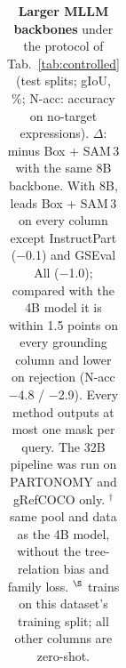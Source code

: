 \begin{table}[t]
{\begin{tabular}{l ccccccc ccccc cc}
\bottomrule
\end{tabular}}
\caption{\textbf{Larger MLLM backbones} under the protocol of Tab.~\ref{tab:controlled} (test splits; gIoU, \%; N-acc:
accuracy on no-target expressions). $\Delta$: \ours{} minus Box + SAM\,3 with the same 8B backbone. With 8B, \ours{}
leads Box + SAM\,3 on every column except InstructPart ($-$0.1) and GSEval All ($-$1.0); compared with the 4B model it is within 1.5 points on every grounding column and
lower on rejection (N-acc $-$4.8 / $-$2.9). Every method outputs at most one mask per query. The 32B pipeline was run on PARTONOMY and gRefCOCO only. $^\dagger$same pool and data as the 4B model, without the tree-relation bias and family
loss. $^\S$\ours{} trains on this dataset's training split; all other columns are zero-shot.}
\label{tab:backbones}
\end{table}

